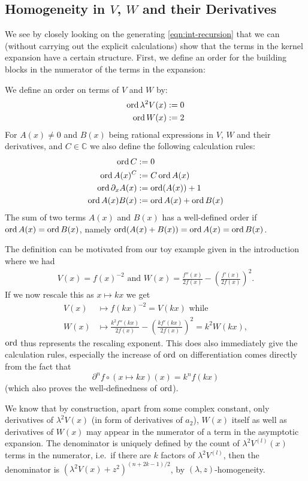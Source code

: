 \subsection{Homogeneity in $V$, $W$ and their Derivatives}
We see by closely looking on the generating \cref{eqn:int-recursion} that we can
(without carrying out the explicit calculations) show that the terms in the
kernel expansion have a certain structure.  First, we define an order for the
building blocks in the numerator of the terms in the expansion:
\begin{Definition}
  \label{def:order}
  We define an order on terms of $V$ and $W$ by:
  \begin{align*}
    \operatorname{ord} \lambda^2 V(x) &:= 0 \\
              \operatorname{ord} W(x) &:= 2
  \end{align*}
  For $A(x)\neq 0$ and $B(x)$ being rational expressions in $V$, $W$ and their
  derivatives, and $C\in\mathbb{C}$ we also define the following calculation
  rules:
  \begin{align*}
    \operatorname{ord} C &:= 0 \\
    \operatorname{ord} A(x)^{C} &:= C\operatorname{ord} A(x) \\
    \operatorname{ord} \partial_x A(x) &:= \operatorname{ord}(A(x)) + 1 \\
    \operatorname{ord} A(x)B(x) &:= \operatorname{ord} A(x) + \operatorname{ord} B(x)
  \end{align*}
  The sum of two terms $A(x)$ and $B(x)$ has a well-defined order if $\operatorname{ord} A(x)
  = \operatorname{ord} B(x)$, namely $\operatorname{ord}(A(x) + B(x)) = \operatorname{ord} A(x) = \operatorname{ord} B(x)$.
  \begin{Remark}
    The definition can be motivated from our toy example given in the
    introduction where we had
    \begin{align*}
      V(x) = f(x)^{-2} \text{ and } W(x) = \frac{f''(x)}{2f(x)} -
      \left(\frac{f'(x)}{2f(x)}\right)^2.
    \end{align*}
    If we now rescale this as $x\mapsto kx$ we get
    \begin{align*}
      V(x) &\mapsto f(kx)^{-2} = V(kx) \text{ while} \\
      W(x) &\mapsto \frac{k^2 f''(kx)}{2f(x)} -
      \left(\frac{kf'(kx)}{2f(x)}\right)^2 = k^2 W(kx),
    \end{align*}
    $\operatorname{ord}$ thus represents the rescaling exponent. This does also immediately
    give the calculation rules, especially the increase of $\operatorname{ord}$ on
    differentiation comes directly from the fact that
    \begin{equation*}
      \partial^n f\circ(x\mapsto kx)(x) = k^n f(kx)
    \end{equation*}
    (which also proves the well-definedness of $\operatorname{ord}$).
  \end{Remark}
\end{Definition}
We know that by construction, apart from some complex constant, only derivatives
of $\lambda^2 V(x)$ (in form of derivatives of $a_2$), $W(x)$ itself as well as
derivatives of $W(x)$ may appear in the numerator of a term in the asymptotic
expansion. The denominator is uniquely defined by the count of $\lambda^2
V^{(l)}(x)$ terms in the numerator, i.e.\ if there are $k$ factors of $\lambda^2
V^{(l)}$, then the denominator is $(\lambda^2 V(x) + z^2)^{(n+2k-1)/2}$, by
$(\lambda,z)$-homogeneity.

